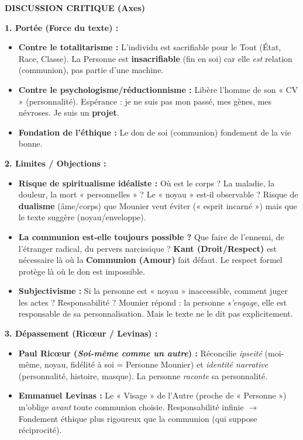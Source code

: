\documentclass[11pt]{article}
\begin{document}
\begin{exoresolu}
\textbf{DISCUSSION CRITIQUE (Axes)}

\textbf{1. Portée (Force du texte) :}
\begin{itemize}
    \item \textbf{Contre le totalitarisme :} L'individu est sacrifiable pour le Tout (État, Race, Classe). La Personne est \textbf{insacrifiable} (fin en soi) car elle \emph{est} relation (communion), pas partie d'une machine.
    \item \textbf{Contre le psychologisme/réductionnisme :} Libère l'homme de son « CV » (personnalité). Espérance : je ne suis pas mon passé, mes gènes, mes névroses. Je suis un \textbf{projet}.
    \item \textbf{Fondation de l'éthique :} Le don de soi (communion) fondement de la vie bonne.
\end{itemize}

\textbf{2. Limites / Objections :}
\begin{itemize}
    \item \textbf{Risque de spiritualisme idéaliste :} Où est le corps ? La maladie, la douleur, la mort « personnelles » ? Le « noyau » est-il observable ? Risque de \textbf{dualisme} (âme/corps) que Mounier veut éviter (« esprit incarné ») mais que le texte suggère (noyau/enveloppe).
    \item \textbf{La communion est-elle toujours possible ?} Que faire de l'ennemi, de l'étranger radical, du pervers narcissique ? \textbf{Kant (Droit/Respect)} est nécessaire là où la \textbf{Communion (Amour)} fait défaut. Le respect formel protège là où le don est impossible.
    \item \textbf{Subjectivisme :} Si la personne est « noyau » inaccessible, comment juger les actes ? Responsabilité ? Mounier répond : la personne \emph{s'engage}, elle est responsable de sa personnalisation. Mais le texte ne le dit pas explicitement.
\end{itemize}

\textbf{3. Dépassement (Ricœur / Levinas) :}
\begin{itemize}
    \item \textbf{Paul Ricœur (\textit{Soi-même comme un autre}) :} Réconcilie \emph{ipseité} (moi-même, noyau, fidélité à soi = Personne Mounier) et \emph{identité narrative} (personnalité, histoire, masque). La personne \emph{raconte} sa personnalité.
    \item \textbf{Emmanuel Levinas :} Le « Visage » de l'Autre (proche de « Personne ») m'oblige \emph{avant} toute communion choisie. Responsabilité infinie $\to$ Fondement éthique plus rigoureux que la communion (qui suppose réciprocité).
\end{itemize}


\end{exoresolu}
\end{document}
